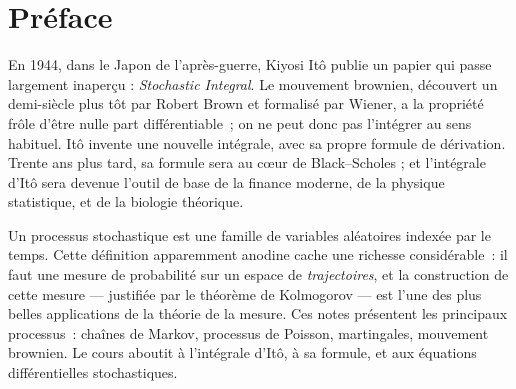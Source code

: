 \documentclass[12pt,a4paper,twoside]{book}
\theoremstyle{definition}
\theoremstyle{plain}
\theoremstyle{remark}
\begin{document}
\begin{titlepage}
\end{titlepage}

\frontmatter
\tableofcontents


\chapter*{Pr\'eface}

En 1944, dans le Japon de l'apr\`es-guerre, Kiyosi It\^o publie un papier qui passe largement inaper\c{c}u : \emph{Stochastic Integral}. Le mouvement brownien, d\'ecouvert un demi-si\`ecle plus t\^ot par Robert Brown et formalis\'e par Wiener, a la propri\'et\'e fr\^ole d'\^etre nulle part diff\'erentiable~; on ne peut donc pas l'int\'egrer au sens habituel. It\^o invente une nouvelle int\'egrale, avec sa propre formule de d\'erivation. Trente ans plus tard, sa formule sera au c\oe ur de Black--Scholes ; et l'int\'egrale d'It\^o sera devenue l'outil de base de la finance moderne, de la physique statistique, et de la biologie th\'eorique.

\medskip

Un processus stochastique est une famille de variables al\'eatoires index\'ee par le temps. Cette d\'efinition apparemment anodine cache une richesse consid\'erable~: il faut une mesure de probabilit\'e sur un espace de \emph{trajectoires}, et la construction de cette mesure --- justifi\'ee par le th\'eor\`eme de Kolmogorov --- est l'une des plus belles applications de la th\'eorie de la mesure. Ces notes pr\'esentent les principaux processus~: cha\^ines de Markov, processus de Poisson, martingales, mouvement brownien. Le cours aboutit \`a l'int\'egrale d'It\^o, \`a sa formule, et aux \'equations diff\'erentielles stochastiques.
\end{document}
